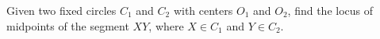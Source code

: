 Given two fixed circles $C_1$ and $C_2$ with centers $O_1$ and $O_2$, find the locus of midpoints of the segment $XY$, where $X \in C_1$ and $Y \in C_2$.
